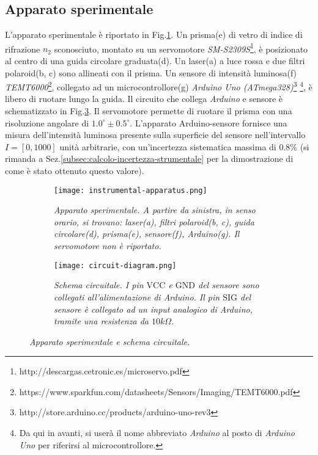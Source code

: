 \subsection{Apparato sperimentale}\label{subsec:apparato-sperimentale}
  L’apparato sperimentale è riportato in Fig.\ref{fig:apparato-strumentale}.
  Un prisma(e) di vetro di indice di rifrazione $n_2$ sconosciuto, montato su un servomotore \emph{SM-S2309S}\footnote{http://descargas.cetronic.es/microservo.pdf},
  è posizionato al centro di una guida circolare graduata(d).
  Un laser(a) a luce rossa e due filtri polaroid(b, c) sono
  allineati con il prisma. Un sensore di intensità luminosa(f) \emph{TEMT6000}\footnote{https://www.sparkfun.com/datasheets/Sensors/Imaging/TEMT6000.pdf},
  collegato ad un microcontrollore(g) \emph{Arduino Uno (ATmega328)}\footnote{http://store.arduino.cc/products/arduino-uno-rev3}%
  \footnote{Da qui in avanti, si userà il nome abbreviato \emph{Arduino} al posto di \emph{Arduino Uno} per riferirsi al microcontrollore.},
  è libero di ruotare lungo la guida.
  Il circuito che collega \emph{Arduino} e sensore è schematizzato in Fig.\ref{fig:diagramma-circuito}.
  Il servomotore permette di ruotare il prisma con una risoluzione angolare di ${1.0^\circ \pm 0.5^\circ}$.
  L'apparato Arduino-sensore fornisce una misura dell'intensità luminosa presente
  sulla superficie del sensore nell'intervallo $I = [0, 1000]$ unità arbitrarie,
  con un'incertezza sistematica massima di $0.8\%$ (si rimanda a Sez.\ref{subsec:calcolo-incertezza-strumentale}
  per la dimostrazione di come è stato ottenuto questo valore).
%
  \begin{figure}[h]
    \centering
    \begin{subfigure}{.47\textwidth}
      \texttt{[image: instrumental-apparatus.png]}
      \caption{
        \emph{
          Apparato sperimentale. A partire da sinistra, in senso orario,
          si trovano: laser(a), filtri polaroid(b, c), guida circolare(d),
          prisma(e), sensore(f), Arduino(g). Il servomotore non è riportato.
        }
      }
      \label{fig:apparato-strumentale}
    \end{subfigure}%
    \hspace{5mm}
    \begin{subfigure}{.47\textwidth}
      \texttt{[image: circuit-diagram.png]}
      \caption{
        \emph{
          Schema circuitale. I pin $\text{VCC}$ e $\text{GND}$ del sensore sono collegati
          all'alimentazione di Arduino. Il pin $\text{SIG}$
          del sensore è collegato ad un input analogico di Arduino, tramite una
          resistenza da $10k\Omega$.
        }
      }
      \label{fig:diagramma-circuito}
    \end{subfigure}
    \caption{\emph{Apparato sperimentale e schema circuitale.}}
  \end{figure}
%
